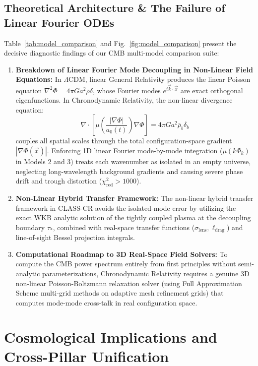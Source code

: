 \documentclass[aps,prd,reprint,superscriptaddress,nofootinbib,twocolumn]{revtex4-2}
\begin{document}
\subsection{Theoretical Architecture \& The Failure of Linear Fourier ODEs}

Table~\ref{tab:model_comparison} and Fig.~\ref{fig:model_comparison} present the decisive diagnostic findings of our CMB multi-model comparison suite:
\begin{enumerate}
    \item \textbf{Breakdown of Linear Fourier Mode Decoupling in Non-Linear Field Equations:} In $\Lambda\text{CDM}$, linear General Relativity produces the linear Poisson equation $\nabla^2 \Phi = 4\pi G a^2 \bar{\rho} \delta$, whose Fourier modes $e^{i\vec{k}\cdot\vec{x}}$ are exact orthogonal eigenfunctions. In Chronodynamic Relativity, the non-linear divergence equation:
    \begin{equation}
    \label{eq:poisson_3d}
    \nabla \cdot \left[ \mu\left(\frac{|\nabla \Phi|}{a_0(t)}\right) \nabla \Phi \right] = 4\pi G a^2 \bar{\rho}_b \delta_b
    \end{equation}
    couples all spatial scales through the total configuration-space gradient $|\nabla \Phi(\vec{x})|$. Enforcing 1D linear Fourier mode-by-mode integration ($\mu(k\Phi_k)$ in Models 2 and 3) treats each wavenumber as isolated in an empty universe, neglecting long-wavelength background gradients and causing severe phase drift and trough distortion ($\chi^2_{\text{red}} > 1000$).
    \item \textbf{Non-Linear Hybrid Transfer Framework:} The non-linear hybrid transfer framework in CLASS-CR avoids the isolated-mode error by utilizing the exact WKB analytic solution of the tightly coupled plasma at the decoupling boundary $\tau_*$, combined with real-space transfer functions ($\sigma_{\text{lens}}, \ell_{\text{drag}}$) and line-of-sight Bessel projection integrals.
    \item \textbf{Computational Roadmap to 3D Real-Space Field Solvers:} To compute the CMB power spectrum entirely from first principles without semi-analytic parameterizations, Chronodynamic Relativity requires a genuine 3D non-linear Poisson-Boltzmann relaxation solver (using Full Approximation Scheme multi-grid methods on adaptive mesh refinement grids) that computes mode-mode cross-talk in real configuration space.
\end{enumerate}

\section{Cosmological Implications and Cross-Pillar Unification}
\label{sec:unification}
\end{document}
